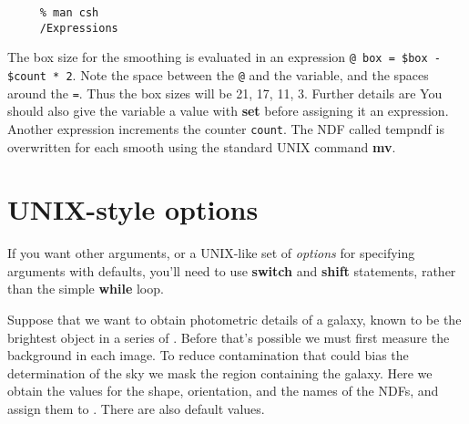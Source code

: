 \small
\begin{verbatim}
     % man csh
     /Expressions
\end{verbatim}
\normalsize

The box size for the smoothing is evaluated in an expression
\mbox{\tt @ box = \$box - \$count * 2}.  Note the space between the
{\tt @} and the variable, and the spaces around the {\tt =}.  Thus
the box sizes will be 21, 17, 11, 3.  Further details are 
You should also give the variable a value with {\bf set} before
assigning it an expression.  Another expression increments the counter
{\tt count}.  The NDF called tempndf is overwritten for each smooth
using the standard UNIX command {\bf mv}.

\newpage
\section{UNIX-style options
\label{sc4_se_unix_options}}

If you want other arguments, or a UNIX-like set of {\em options\/}
for specifying arguments with defaults, you'll need to use {\bf switch}
and {\bf shift} statements, rather than the simple {\bf while} loop.

Suppose that we want to obtain photometric details of a galaxy, known
to be the brightest object in a series of .  Before
that's possible we must first measure the background in each image.
To reduce contamination that could bias the determination of the sky
we mask the region containing the galaxy.  Here we obtain the values
for the shape, orientation, and the names of the NDFs, and assign them
to .  There are also default values.

